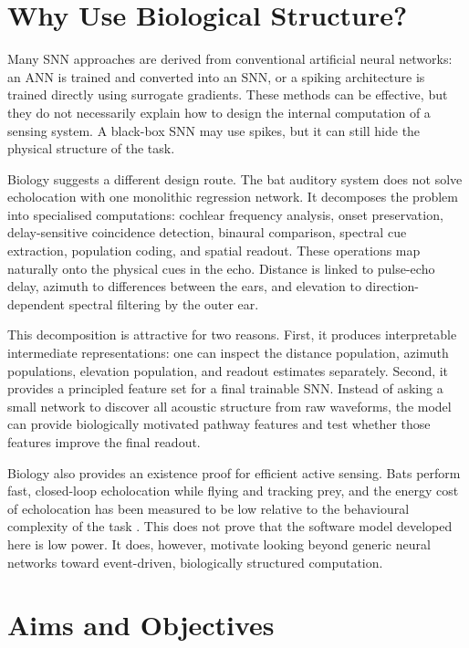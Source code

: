 \section{Why Use Biological Structure?}

Many SNN approaches are derived from conventional artificial neural networks: an ANN is trained and converted into an SNN, or a spiking architecture is trained directly using surrogate gradients. These methods can be effective, but they do not necessarily explain how to design the internal computation of a sensing system. A black-box SNN may use spikes, but it can still hide the physical structure of the task.

Biology suggests a different design route. The bat auditory system does not solve echolocation with one monolithic regression network. It decomposes the problem into specialised computations: cochlear frequency analysis, onset preservation, delay-sensitive coincidence detection, binaural comparison, spectral cue extraction, population coding, and spatial readout. These operations map naturally onto the physical cues in the echo. Distance is linked to pulse-echo delay, azimuth to differences between the ears, and elevation to direction-dependent spectral filtering by the outer ear.

This decomposition is attractive for two reasons. First, it produces interpretable intermediate representations: one can inspect the distance population, azimuth populations, elevation population, and readout estimates separately. Second, it provides a principled feature set for a final trainable SNN. Instead of asking a small network to discover all acoustic structure from raw waveforms, the model can provide biologically motivated pathway features and test whether those features improve the final readout.

Biology also provides an existence proof for efficient active sensing. Bats perform fast, closed-loop echolocation while flying and tracking prey, and the energy cost of echolocation has been measured to be low relative to the behavioural complexity of the task \cite{Speakman1989ThePipistrellus}. This does not prove that the software model developed here is low power. It does, however, motivate looking beyond generic neural networks toward event-driven, biologically structured computation.

\section{Aims and Objectives}

